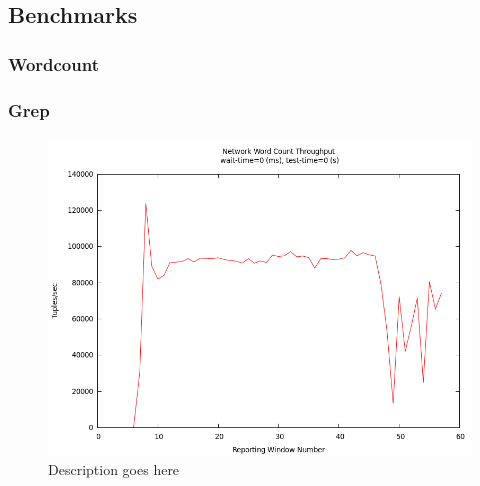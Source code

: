 
\subsection{Benchmarks}
\subsubsection{Wordcount}
\subsubsection{Grep}

\begin{figure}[t]
\centering
\includegraphics[width=.8\linewidth]{figures/tput.png}
\caption{Description goes here}
\label{fig:label-me-if-you-want}
\end{figure}
